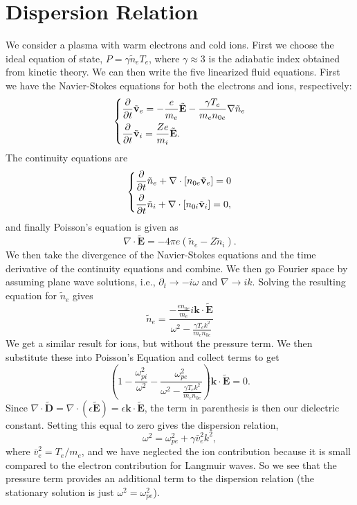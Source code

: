 \documentclass[12pt]{article}
\newcommand{\p}{\partial}
\newcommand{\mb}{\mathbf}
\begin{document}
\section*{Dispersion Relation}
We consider a plasma with warm electrons and cold ions. First we choose the ideal equation of state, $P=\gamma \tilde{n}_e T_e$, where $\gamma \approx 3$ is the adiabatic index obtained from kinetic theory. We can then write the five linearized fluid equations. First we have the Navier-Stokes equations for both the electrons and ions, respectively:
\[
	\begin{dcases}
		\frac{\p}{\p t}\tilde{\mb{v}}_e=-\frac{e}{m_e}\tilde{\mb{E}}-\frac{\gamma T_e}{m_e n_{0e}}\nabla \tilde{n}_e\\
		\frac{\p}{\p t} \tilde{\mb{v}}_i=\frac{Ze}{m_i}\tilde{\mb{E}}.
	\end{dcases}
\]
The continuity equations are
\[
	\begin{dcases}
		\frac{\p}{\p t}\tilde{n}_e+\nabla \cdot [n_{0e}\tilde{\mb{v}}_e]=0\\
		\frac{\p}{\p t}\tilde{n}_i+\nabla \cdot [n_{0i}\tilde{\mb{v}}_i]=0,
	\end{dcases}
\]
and finally Poisson's equation is given as
\[
	\nabla \cdot \tilde{\mb{E}}=-4 \pi e (\tilde{n}_e-Z\tilde{n}_i).
\]
We then take the divergence of the Navier-Stokes equations and the time derivative of the continuity equations and combine. We then go Fourier space by assuming plane wave solutions, i.e., $\p_t \rightarrow -i\omega$ and $\nabla \rightarrow ik$. Solving the resulting equation for $\tilde{n}_e$ gives
\[
	\tilde{n}_e=\frac{-\frac{e n_{0e}}{m_e}i\mb{k}\cdot\tilde{\mb{E}}}{\omega^2-\frac{\gamma T_e k^2}{m_e n_{0e}}}
\]
We get a similar result for ions, but without the pressure term. We then substitute these into Poisson's Equation and collect terms to get
\[
	\left( 1-\frac{\omega_{pi}^2}{\omega ^2}-\frac{\omega_{pe}^2}{\omega^2-\frac{\gamma T_e k^2}{m_e n_{0e}}}\right) \mb{k}\cdot\tilde{\mb{E}}=0.
\]
Since $\nabla \cdot \tilde{\mb{D}} = \nabla \cdot (\epsilon \tilde{\mb{E}}) = \epsilon \mb{k} \cdot \tilde{\mb{E}}$, the term in parenthesis is then our dielectric constant. Setting this equal to zero gives the dispersion relation,
\[
	\omega^2=\omega_{pe}^2+\gamma \bar{v}_e^2 k^2,
\]
where $\bar{v}_e^2=T_e/m_e$, and we have neglected the ion contribution because it is small compared to the electron contribution for Langmuir waves. So we see that the pressure term provides an additional term to the dispersion relation (the stationary solution is just $\omega^2=\omega_{pe}^2$).
\end{document}
